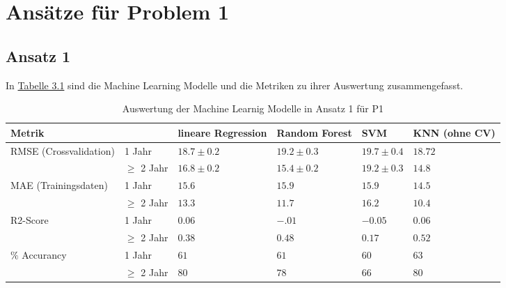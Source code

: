 \section{Ans\"atze f\"ur Problem 1}


\subsection{Ansatz 1}
In \hyperref[tab:ergebnisA1P1]{Tabelle 3.1} sind die Machine Learning Modelle und die Metriken zu ihrer Auswertung zusammengefasst.

\begin{table}[ht]
  \caption{\label{tab:ergebnisA1P1} Auswertung der Machine Learnig Modelle in Ansatz 1 f\"ur P1}
  \begin{tabular}{ p{3cm} p{2cm} p{2cm} p{2cm} p{2cm} p{1.5cm} }
    \toprule
    Metrik &               & lineare Regression & Random Forest  & SVM            & KNN (ohne CV) \\
    \midrule
    \multirow{2}{3em}{RMSE (Crossvalidation)}
           & 1 Jahr        & $18.7 \pm 0.2$     & $19.2 \pm 0.3$ & $19.7 \pm 0.4$ & $18.72$       \\
           & $\geq$ 2 Jahr & $16.8 \pm 0.2$     & $15.4 \pm 0.2$ & $19.2 \pm 0.3$ & $14.8$        \\

    \midrule
    \multirow{2}{3em}{MAE (Trainingsdaten)}
           & 1 Jahr        & $15.6$             & $15.9$         & $15.9$         & $14.5$        \\
           & $\geq$ 2 Jahr & $13.3$             & $11.7$         & $16.2$         & $10.4$        \\

    \midrule
    \multirow{2}{3em}{R2-Score}
           & 1 Jahr        & $0.06$             & $-.01$         & $-0.05$        & $0.06$        \\
           & $\geq$ 2 Jahr & $0.38$             & $0.48$         & $0.17$         & $0.52$        \\

    \midrule
    \multirow{2}{3em}{$\%$ Accurancy}
           & 1 Jahr        & $61$               & $61$           & $60$           & $63$          \\
           & $\geq$ 2 Jahr & $80$               & $78$           & $66$           & $80$          \\

    \bottomrule
  \end{tabular}

\end{table}

